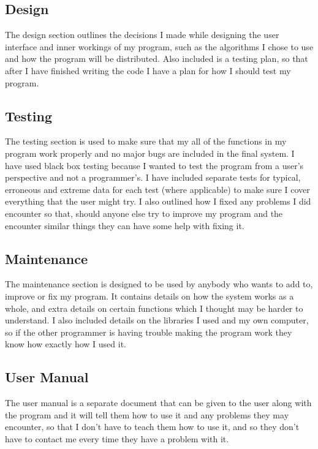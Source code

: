 \subsection{Design}
The design section outlines the decisions I made while designing the user
interface and inner workings of my program, such as the algorithms I chose to
use and how the program will be distributed. Also included is a testing plan, so
that after I have finished writing the code I have a plan for how I should test
my program.
\subsection{Testing}
The testing section is used to make sure that my all of the functions in my
program work properly and no major bugs are included in the final system. I have
used black box testing because I wanted to test the program from a user's
perspective and not a programmer's. I have included separate tests for typical,
erroneous and extreme data for each test (where applicable) to make sure I cover
everything that the user might try. I also outlined how I fixed any problems I
did encounter so that, should anyone else try to improve my program and the
encounter similar things they can have some help with fixing it.
\subsection{Maintenance}
The maintenance section is designed to be used by anybody who wants to add to,
improve or fix my program. It contains details on how the system works as a
whole, and extra details on certain functions which I thought may be harder to
understand. I also included details on the libraries I used and my own computer,
so if the other programmer is having trouble making the program work they know
how exactly how I used it.
\subsection{User Manual}
The user manual is a separate document that can be given to the user along with
the program and it will tell them how to use it and any problems they may
encounter, so that I don't have to teach them how to use it, and so they don't
have to contact me every time they have a problem with it.

